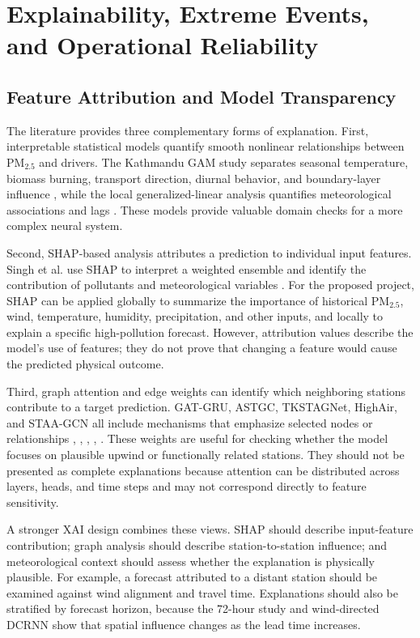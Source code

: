 \section{Explainability, Extreme Events, and Operational Reliability}

\subsection{Feature Attribution and Model Transparency}

The literature provides three complementary forms of explanation. First, interpretable statistical models quantify smooth nonlinear relationships between PM$_{2.5}$ and drivers. The Kathmandu GAM study separates seasonal temperature, biomass burning, transport direction, diurnal behavior, and boundary-layer influence \cite{ref7}, while the local generalized-linear analysis quantifies meteorological associations and lags \cite{ref5}. These models provide valuable domain checks for a more complex neural system.

Second, SHAP-based analysis attributes a prediction to individual input features. Singh et al. use SHAP to interpret a weighted ensemble and identify the contribution of pollutants and meteorological variables \cite{ref12}. For the proposed project, SHAP can be applied globally to summarize the importance of historical PM$_{2.5}$, wind, temperature, humidity, precipitation, and other inputs, and locally to explain a specific high-pollution forecast. However, attribution values describe the model's use of features; they do not prove that changing a feature would cause the predicted physical outcome.

Third, graph attention and edge weights can identify which neighboring stations contribute to a target prediction. GAT-GRU, ASTGC, TKSTAGNet, HighAir, and STAA-GCN all include mechanisms that emphasize selected nodes or relationships \cite{ref13}, \cite{ref19}, \cite{ref25}, \cite{ref26}, \cite{ref34}. These weights are useful for checking whether the model focuses on plausible upwind or functionally related stations. They should not be presented as complete explanations because attention can be distributed across layers, heads, and time steps and may not correspond directly to feature sensitivity.

A stronger XAI design combines these views. SHAP should describe input-feature contribution; graph analysis should describe station-to-station influence; and meteorological context should assess whether the explanation is physically plausible. For example, a forecast attributed to a distant station should be examined against wind alignment and travel time. Explanations should also be stratified by forecast horizon, because the 72-hour study \cite{ref15} and wind-directed DCRNN \cite{ref14} show that spatial influence changes as the lead time increases.

